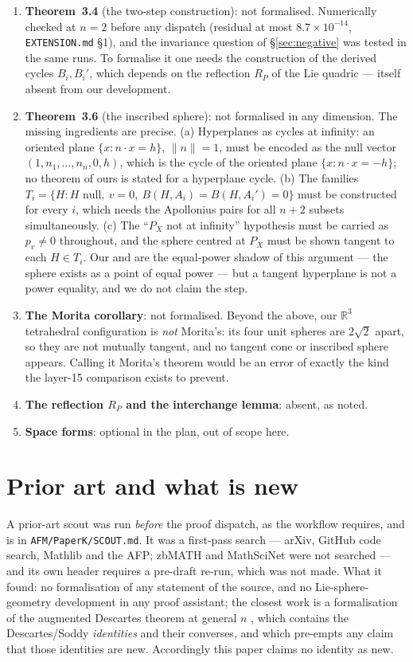 \documentclass[11pt]{article}
\theoremstyle{definition}
\theoremstyle{remark}
\newcommand{\RR}{\mathbb{R}}
\begin{document}
\begin{enumerate}
\item \textbf{Theorem~3.4} (the two-step construction): not formalised. Numerically checked at $n=2$
before any dispatch (residual at most $8.7\times10^{-14}$, \texttt{EXTENSION.md} \S1), and the
invariance question of \S\ref{sec:negative} was tested in the same runs. To formalise it one needs the construction of the
derived cycles $B_i,B_i'$, which depends on the reflection $R_P$ of the Lie quadric --- itself
absent from our development.
\item \textbf{Theorem~3.6} (the inscribed sphere): not formalised in any dimension. The missing
ingredients are precise. (a) Hyperplanes as cycles at infinity: an oriented plane
$\{x:n\cdot x=h\}$, $\lVert n\rVert=1$, must be encoded as the null vector $(1,n_1,\dots,n_n,0,h)$, which is
the cycle of the oriented plane $\{x:n\cdot x=-h\}$; no theorem of ours is stated for a hyperplane
cycle. (b) The families
$T_i=\{H: H\text{ null},\ v=0,\ B(H,A_i)=B(H,A_i')=0\}$ must be constructed for every $i$, which
needs the Apollonius pairs for all $n+2$ subsets simultaneously. (c) The ``$P_X$ not at infinity''
hypothesis must be carried as $p_v\neq0$ throughout, and the sphere centred at $P_X$ must be shown
tangent to each $H\in T_i$. Our  and
 are the equal-power shadow of this argument --- the sphere exists as a
point of equal power --- but a tangent hyperplane is not a power equality, and we do not claim the
step.
\item \textbf{The Morita corollary}: not formalised. Beyond the above, our $\RR^3$ tetrahedral
configuration is \emph{not} Morita's: its four unit spheres are $2\sqrt2$ apart, so they are not
mutually tangent, and no tangent cone or inscribed sphere appears. Calling it Morita's theorem would
be an error of exactly the kind the layer-15 comparison exists to prevent.
\item \textbf{The reflection $R_P$ and the interchange lemma}: absent, as noted.
\item \textbf{Space forms}: optional in the plan, out of scope here.
\end{enumerate}

\section{Prior art and what is new}\label{sec:prior}

A prior-art scout was run \emph{before} the proof dispatch, as the workflow requires, and is in
\texttt{AFM/PaperK/SCOUT.md}. It was a first-pass search --- arXiv, GitHub code search,
Mathlib and the AFP; zbMATH and MathSciNet were not searched --- and its own header requires a
pre-draft re-run, which was not made. What it found: no formalisation of any statement of the source,
and no Lie-sphere-geometry development in any proof assistant; the closest work is a formalisation of
the augmented Descartes theorem at general $n$ \cite{augdescartes}, which contains the
Descartes/Soddy \emph{identities} and their converses, and which pre-empts any claim that those
identities are new. Accordingly this paper claims no identity as new.
\end{document}
